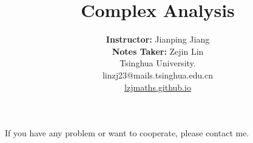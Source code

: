 \documentclass[12pt,b5paper,notitlepage]{article}
\title{Complex Analysis}
\author{
  {{\bf Instructor:} Jianping Jiang}\\
  {{\bf Notes Taker:} Zejin Lin}\\
	{\small \sc Tsinghua University.}\\
	{\small linzj23@mails.tsinghua.edu.cn}\\
  {\small \href{lzjmaths.github.io}{lzjmaths.github.io}}
}
\theoremstyle{definition}
\theoremstyle{remark}
\theoremstyle{plain}
\numberwithin{equation}{section}
\renewcommand{\|}{\Vert}
\begin{document}
\sloppy
{}
\maketitle
\begin{center}
  If you have any problem or want to cooperate, please contact me.
\end{center}
\tableofcontents
\newpage






































\printindex
\newpage
\listoftheorems[ignoreall, show={theorem,proposition}]
\end{document}

